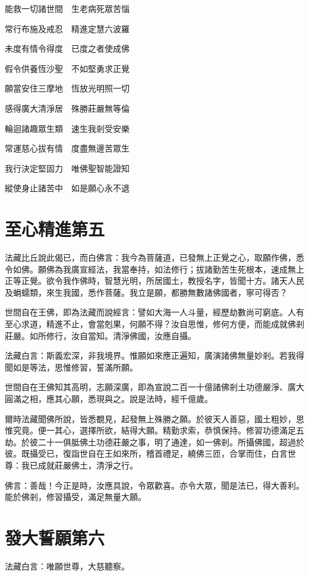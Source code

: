 \documentclass{zhvt-classic}
\begin{document}
能救一切諸世間　生老病死眾苦惱

常行布施及戒忍　精進定慧六波羅

未度有情令得度　已度之者使成佛

假令供養恆沙聖　不如堅勇求正覺

願當安住三摩地　恆放光明照一切

感得廣大清淨居　殊勝莊嚴無等倫

輪迴諸趣眾生類　速生我剎受安樂

常運慈心拔有情　度盡無邊苦眾生

我行決定堅固力　唯佛聖智能證知

縱使身止諸苦中　如是願心永不退

\chapter*{至心精進第五}

法藏比丘說此偈已，而白佛言：我今為菩薩道，已發無上正覺之心，取願作佛，悉令如佛。願佛為我廣宣經法，我當奉持，如法修行；拔諸勤苦生死根本，速成無上正等正覺。欲令我作佛時，智慧光明，所居國土，教授名字，皆聞十方。諸天人民及蜎蠕類，來生我國，悉作菩薩。我立是願，都勝無數諸佛國者，寧可得否？

世間自在王佛，即為法藏而說經言：譬如大海一人斗量，經歷劫數尚可窮底。人有至心求道，精進不止，會當剋果，何願不得？汝自思惟，修何方便，而能成就佛剎莊嚴。如所修行，汝自當知。清淨佛國，汝應自攝。

法藏白言：斯義宏深，非我境界。惟願如來應正遍知，廣演諸佛無量妙剎。若我得聞如是等法，思惟修習，誓滿所願。

世間自在王佛知其高明，志願深廣，即為宣說二百一十億諸佛剎土功德嚴淨、廣大圓滿之相，應其心願，悉現與之。說是法時，經千億歲。

爾時法藏聞佛所說，皆悉覩見，起發無上殊勝之願。於彼天人善惡，國土粗妙，思惟究竟。便一其心，選擇所欲，結得大願。精勤求索，恭慎保持。修習功德滿足五劫。於彼二十一俱胝佛土功德莊嚴之事，明了通達，如一佛剎。所攝佛國，超過於彼。既攝受已，復詣世自在王如來所，稽首禮足，繞佛三匝，合掌而住，白言世尊：我已成就莊嚴佛土，清淨之行。

佛言：善哉！今正是時，汝應具說，令眾歡喜。亦令大眾，聞是法已，得大善利。能於佛剎，修習攝受，滿足無量大願。

\chapter*{發大誓願第六}

法藏白言：唯願世尊，大慈聽察。
\end{document}
